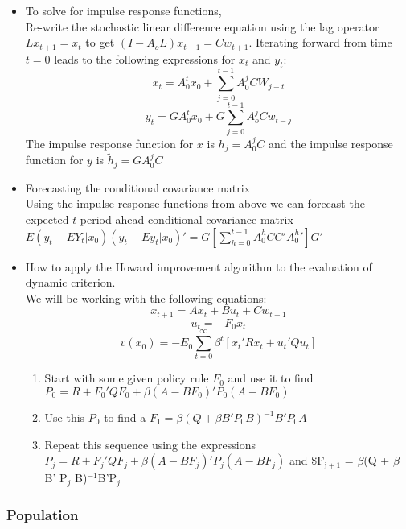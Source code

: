 \documentclass[11pt]{article}
\begin{document}
\begin{itemize}
\item To solve for impulse response functions,\\
\label{sec-1-1-3-2-3}%
Re-write the stochastic linear difference equation using the lag
operator $Lx_{t+1} = x_t$ to get $(I - A_o L)x_{t+1} = C
w_{t+1}$. Iterating forward from time $t=0$ leads to the following
expressions for $x_t$ and $y_t$: $$x_t = A_0^t x_0 + \sum_{j=0}^{t-1}
A_0^j C W_{j-t}$$ $$ y_t = G A_0^t x_0 + G \sum_{j=0}^{t-1} A_o^j C
w_{t-j}$$ The impulse response function for $x$ is $h_j = A_0^j C$ and
the impulse response function for $y$ is $\tilde{h}_j = G A_0^j C$


\item Forecasting the conditional covariance matrix\\
\label{sec-1-1-3-2-4}%
Using the impulse response functions from above we can forecast the
expected $t$ period ahead conditional covariance matrix $E(y_t -
EY_t|x_0)(y_t - Ey_t|x_0)' = G \left[\sum_{h=0}^{t-1} A_0^h C C'
{A_0^h}'\right] G'$


\item How to apply the Howard improvement algorithm to the evaluation of dynamic criterion.\\
\label{sec-1-1-3-2-5}%
We will be working with the following equations: $$x_{t+1} = A x_t + B
u_t + C w_{t+1}$$ $$u_t = - F_0 x_t$$ $$v(x_0) = - E_0
\sum_{t=0}^{\infty} \beta^t \left[x_t'Rx_t + u_t'Qu_t \right]$$

\begin{enumerate}
\item Start with some given policy rule $F_0$ and use it to find $P_0 =
   R + F_0'QF_0 + \beta(A - B F_0)'P_0(A - BF_0)$
\item Use this $P_0$ to find a $F_1 = \beta(Q + \beta B'P_0B)^{-1}B'P_0A$
\item Repeat this sequence using the expressions $P_j = R + F_j' Q F_j +
   \beta(A - B F_j)'P_j(A - BF_j)$ and \$F$_{\mathrm{j+1}}$ = $\beta$(Q + $\beta$ B'
   P$_j$ B)$^{\mathrm{-1}}$B'P$_j$
\end{enumerate}
\end{itemize} %
\subsubsection{Population}
\label{sec-1-1-4}
\end{document}
